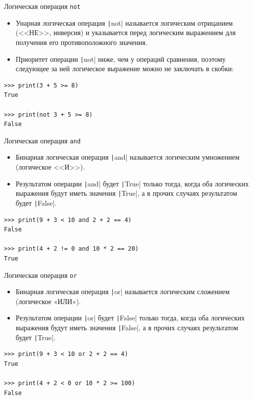 \documentclass[aspectratio=169]{beamer}	%
\begin{document}
\begin{frame}[fragile]{Логическая операция \texttt{not}}
\scriptsize
\begin{itemize}
	\item Унарная логическая операция \texttt|not| называется логическим отрицанием (<<НЕ>>, инверсия) и указывается перед логическим выражением для получения его противоположного значения.
	
	\item Приоритет операции \texttt|not| ниже, чем у операций сравнения, поэтому следующее за ней логическое выражение можно не заключать в скобки:
\end{itemize}
\begin{verbatim}
>>> print(3 + 5 >= 8)
True

>>> print(not 3 + 5 >= 8)
False
\end{verbatim}
\vfill
\end{frame}


\begin{frame}[fragile]{Логическая операция \texttt{and}}
\scriptsize
\begin{itemize}
	\item Бинарная логическая операция \texttt|and| называется логическим умножением (логическое <<И>>).
		
	\item Результатом  операции \texttt|and| будет \texttt|True| только тогда, когда оба логических выражения будут иметь значения \texttt|True|, а в прочих случаях результатом будет \texttt|False|.
\end{itemize}
\begin{verbatim}
>>> print(9 + 3 < 10 and 2 + 2 == 4)
False

>>> print(4 + 2 != 0 and 10 * 2 == 20)
True
\end{verbatim}
\vfill
\end{frame}


\begin{frame}[fragile]{Логическая операция \texttt{or}}
\scriptsize
\begin{itemize}
	\item Бинарная логическая операция \texttt|or| называется логическим сложением (логическое «ИЛИ»).
		
	\item Результатом  операции \texttt|or| будет \texttt|False| только тогда, когда оба логических выражения будут иметь значения \texttt|False|, а в прочих случаях результатом будет \texttt|True|.
\end{itemize}
\begin{verbatim}
>>> print(9 + 3 < 10 or 2 + 2 == 4)
True

>>> print(4 + 2 < 0 or 10 * 2 >= 100)
False
\end{verbatim}
\vfill	
\end{frame}
\end{document}
